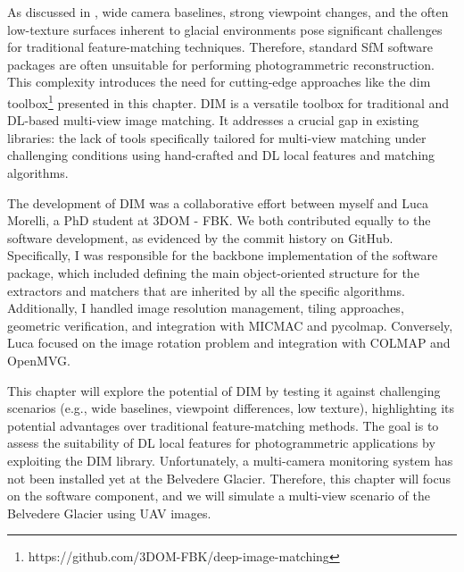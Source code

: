 As discussed in , wide camera baselines, strong viewpoint changes, and the often low-texture surfaces inherent to glacial environments pose significant challenges for traditional feature-matching techniques.
Therefore, standard SfM software packages are often unsuitable for performing photogrammetric reconstruction.
This complexity introduces the need for cutting-edge approaches like the \ac{dim} toolbox\footnote{https://github.com/3DOM-FBK/deep-image-matching} presented in this chapter.
DIM is a versatile toolbox for traditional and DL-based multi-view image matching. 
It addresses a crucial gap in existing libraries: the lack of tools specifically tailored for multi-view matching under challenging conditions using hand-crafted and DL local features and matching algorithms.

The development of DIM was a collaborative effort between myself and Luca Morelli, a PhD student at 3DOM - FBK. 
We both contributed equally to the software development, as evidenced by the commit history on GitHub. 
Specifically, I was responsible for the backbone implementation of the software package, which included defining the main object-oriented structure for the extractors and matchers that are inherited by all the specific algorithms. 
Additionally, I handled image resolution management, tiling approaches, geometric verification, and integration with MICMAC and pycolmap. 
Conversely, Luca focused on the image rotation problem and integration with COLMAP and OpenMVG.

This chapter will explore the potential of DIM by testing it against challenging scenarios (e.g., wide baselines, viewpoint differences, low texture), highlighting its potential advantages over traditional feature-matching methods.  
The goal is to assess the suitability of DL local features for photogrammetric applications by exploiting the DIM library.
Unfortunately, a multi-camera monitoring system has not been installed yet at the Belvedere Glacier. 
Therefore, this chapter will focus on the software component, and we will simulate a multi-view scenario of the Belvedere Glacier using UAV images. 


